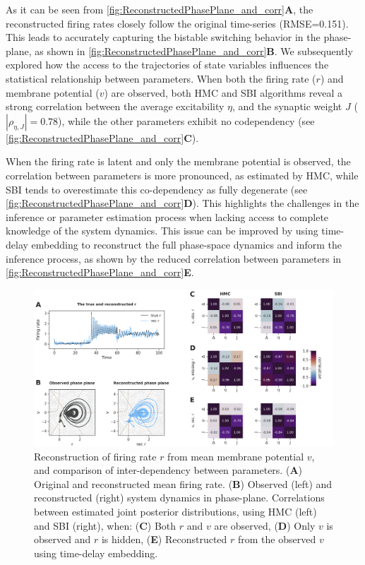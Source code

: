\documentclass[preprint,11pt,authoryear]{elsarticle}
\begin{document}
As it can be seen from \autoref{fig:ReconstructedPhasePlane_and_corr}\textbf{A}, the reconstructed firing rates closely follow the original time-series (RMSE=0.151). This leads to accurately capturing the bistable switching behavior in the phase-plane, as shown in \autoref{fig:ReconstructedPhasePlane_and_corr}\textbf{B}. We subsequently explored how the access to the trajectories of state variables influences the statistical relationship between parameters. When both the firing rate ($r$) and membrane potential ($v$) are observed, both HMC and SBI algorithms reveal a strong correlation between the average excitability $\eta$, and the synaptic weight $J$ ($|\rho_{\eta, J}|= 0.78$), while the other parameters exhibit no codependency (see \autoref{fig:ReconstructedPhasePlane_and_corr}\textbf{C}). 

When the firing rate is latent and only the membrane potential is observed, the correlation between parameters is more pronounced, as estimated by HMC, while SBI tends to overestimate this co-dependency as fully degenerate (see \autoref{fig:ReconstructedPhasePlane_and_corr}\textbf{D}). This highlights the challenges in the inference or parameter estimation process when lacking access to complete knowledge of the system dynamics. This issue can be improved by using time-delay embedding to reconstruct the full phase-space dynamics and inform the inference process, as shown by the reduced correlation between parameters in  \autoref{fig:ReconstructedPhasePlane_and_corr}\textbf{E}. 


\begin{figure}
    \centering
    \includegraphics[width=\linewidth]{Figs/Fig5.png}
    \caption{Reconstruction of firing rate $r$ from mean membrane potential $v$, and comparison of inter-dependency between parameters. (\textbf{A}) Original and reconstructed mean firing rate. (\textbf{B}) Observed (left) and reconstructed (right) system dynamics in phase-plane. Correlations between estimated joint posterior distributions, using HMC (left) and SBI (right), when: (\textbf{C}) Both $r$ and $v$ are observed, (\textbf{D}) Only $v$ is observed and $r$ is hidden, (\textbf{E}) Reconstructed $r$ from the observed $v$ using time-delay embedding. }
    \label{fig:ReconstructedPhasePlane_and_corr}
\end{figure}
\end{document}
